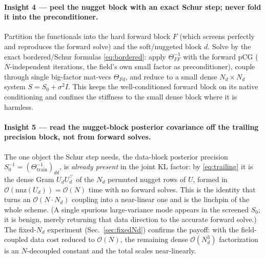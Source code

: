 \documentclass[11pt]{article}
\newcommand{\T}{^{\!\top}}
\newcommand{\inv}{^{-1}}
\newcommand{\Th}{\Theta}
\newcommand{\Thtr}{\Th_{\mathrm{train}}}
\newcommand{\bigO}{\mathcal{O}}
\begin{document}
\paragraph{Insight 4 --- peel the nugget block with an exact Schur step; never
fold it into the preconditioner.} Partition the functionals into the hard
forward block $F$ (which screens perfectly and reproduces the forward solve) and
the soft/nuggeted block $d$. Solve by the exact bordered/Schur formulas
\eqref{eq:bordered}: apply $\Th_{FF}\inv$ with the forward pCG ($N$-independent
iterations, the field's own small factor as preconditioner), couple through
single big-factor mat-vecs $\Th_{Fd}$, and reduce to a small dense
$N_d\times N_d$ system $S=S_0+\sigma^2 I$. This keeps the well-conditioned
forward block on its native conditioning and confines the stiffness to the small
dense block where it is harmless.

\paragraph{Insight 5 --- read the nugget-block posterior covariance off the
trailing precision block, not from forward solves.} The one object the Schur
step needs, the data-block posterior precision $S_0\inv=(\Thtr\inv)_{dd}$, is
\emph{already present} in the joint KL factor: by \eqref{eq:trailing} it is the
dense Gram $U_d U_d\T$ of the $N_d$ permuted nugget rows of $U$, formed in
$\bigO(\mathrm{nnz}(U_d))=\bigO(N)$ time with no forward solves. This is the
identity that turns an $\bigO(N\cdot N_d)$ coupling into a near-linear one and is
the linchpin of the whole scheme. (A single spurious large-variance mode appears
in the screened $S_0$; it is benign, merely returning that data direction to the
accurate forward solve.) The fixed-$N_d$ experiment (Sec.~\ref{sec:fixedNd})
confirms the payoff: with the field-coupled data cost reduced to $\bigO(N)$, the
remaining dense $\bigO(N_d^3)$ factorization is an $N$-decoupled constant and the
total scales near-linearly.
\end{document}
